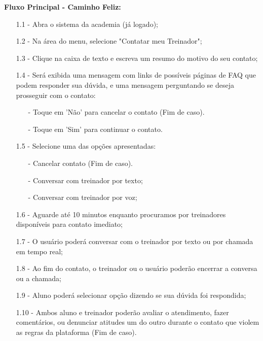 \documentclass{article}
\begin{document}
    \textbf{Fluxo Principal - Caminho Feliz:}

    \begin{itemize}
        \item[1.1 -] Abra o sistema da academia (já logado);
        
        \item[1.2 -] Na área do menu, selecione "Contatar meu Treinador";
        
        \item[1.3 -] Clique na caixa de texto e escreva um resumo do motivo do seu contato;
        
        \item[1.4 -] Será exibida uma mensagem com links de possíveis páginas de FAQ que podem responder sua dúvida, e uma mensagem perguntando se deseja prosseguir com o contato:
        \begin{itemize}
            \item[-] Toque em 'Não' para cancelar o contato (Fim de caso).
            \item[-] Toque em 'Sim' para continuar o contato.
        \end{itemize}
        
        \item[1.5 -]  Selecione uma das opções apresentadas:
        \begin{itemize}
            \item[-] Cancelar contato (Fim de caso).
            \item[-] Conversar com treinador por texto;
            \item[-] Conversar com treinador por voz;
        \end{itemize}
        
        \item[1.6 -] Aguarde até 10 minutos enquanto procuramos por treinadores disponíveis para contato imediato;
        
        \item[1.7 -] O usuário poderá conversar com o treinador por texto ou por chamada em tempo real;
        
        \item[1.8 -] Ao fim do contato, o treinador ou o usuário poderão encerrar a conversa ou a chamada;
        
        \item[1.9 -] Aluno poderá selecionar opção dizendo se sua dúvida foi respondida;
        
        \item[1.10 -] Ambos aluno e treinador poderão avaliar o atendimento, fazer comentários, ou denunciar atitudes um do outro durante o contato que violem as regras da plataforma (Fim de caso).
    \end{itemize}
    
\end{document}

